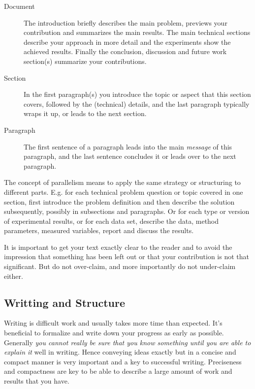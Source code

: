 \documentclass[11pt, a4paper,oneside,chapterprefix=false]{scrbook}
\begin{document}
\begin{description}
\item[Document] The introduction briefly describes the main problem, previews your contribution and summarizes the main results. The main technical sections describe your approach in more detail and the experiments show the achieved results. Finally the conclusion, discussion and future work section(s) summarize your contributions.
\item[Section] In the first paragraph(s) you introduce the topic or aspect that this section covers, followed by the (technical) details, and the last paragraph typically wraps it up, or leads to the next section.
\item[Paragraph] The first sentence of a paragraph leads into the main \emph{message} of this paragraph, and the last sentence concludes it or leads over to the next paragraph.
\end{description}

The concept of parallelism means to apply the same strategy or structuring to different parts. E.g. for each technical problem question or topic covered in one section, first introduce the problem definition and then describe the solution subsequently, possibly in subsections and paragraphs. Or for each type or version of experimental results, or for each data set, describe the data, method parameters, measured variables, report and discuss the results.

It is important to get your text exactly clear to the reader and to avoid the impression that something has been left out or that your contribution is not that significant. But do not over-claim, and more importantly do not under-claim either.

\subsection*{Writting and Structure}

Writing is difficult work and usually takes more time than expected. It's beneficial to formalize and write down your progress as early as possible. Generally \emph{you cannot really be sure that you know something until you are able to explain it} well in writing. Hence conveying ideas exactly but in a concise and compact manner is very important and a key to successful writing. Preciseness and compactness are key to be able to describe a large amount of work and results that you have.
\end{document}
